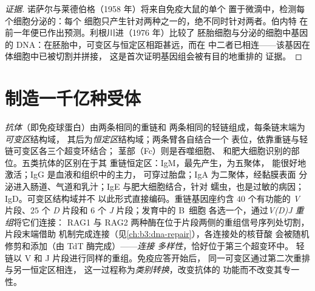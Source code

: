 \begin{proof}[证据]
诺萨尔与莱德伯格（1958 年）将来自免疫大鼠的单个
置于微滴中，检测每个细胞分泌的：每个
细胞只产生针对两种之一的，绝不同时针对两者。伯内特
在前一年便已作出预测。利根川进（1976 年）比较了
胚胎细胞与分泌的细胞中基因的
DNA：在胚胎中，可变区与恒定区相距甚远，而在
中二者已相连——该基因在体细胞中已被切割并拼接，
这是首次证明基因组会被有目的地重排的
证据。
\end{proof}

\section{制造一千亿种受体}

\begin{definition}[抗体结构与 V(D)J 重组]\label{def:b3:adaptive-immunity:antibody}
\emph{抗体}（即免疫球蛋白）由两条相同的重链和
两条相同的轻链组成，每条链末端为\emph{可变区}结构域，
其后为\emph{恒定区}结构域；两条臂各自结合一个
表位，依靠重链与轻链可变区各三个超变环结合；
茎部（Fc）则是吞噬细胞、
和肥大细胞识别的部位。五类抗体的区别在于其
重链恒定区：IgM，最先产生，为五聚体，
能很好地激活；IgG 是血液和组织中的主力，
可穿过胎盘；IgA 为二聚体，经黏膜表面
分泌进入肠道、气道和乳汁；IgE 与肥大细胞结合，针对
蠕虫，也是过敏的病因；IgD。可变区结构域并不
以此形式直接编码。重链基因座约含 $40$ 个有功能的
\emph{V} 片段、$25$ 个 \emph{D} 片段和 $6$ 个 \emph{J} 片段；发育中的 B~细胞
各选一个，通过\emph{V(D)J 重组}将它们连接：
RAG1 与 RAG2 两种酶在位于片段两侧的重组信号序列处切割，
片段末端借助
机制完成连接（见\cref{ch:b3:dna-repair}），各连接处的核苷酸
会被随机修剪和添加（由 TdT 酶完成）——\emph{连接
多样性}，恰好位于第三个超变环中。
轻链以 V 和 J 片段进行同样的重组。免疫应答开始后，
同一可变区通过第二次重排与另一恒定区相连，
这一过程称为\emph{类别转换}，改变抗体的
功能而不改变其专一性。
\end{definition}

